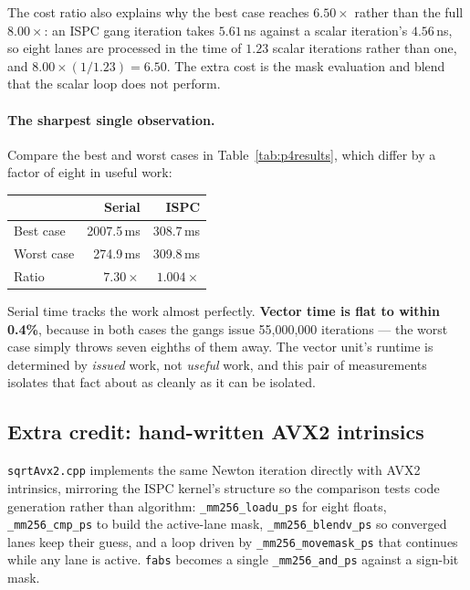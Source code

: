 \documentclass[11pt,a4paper]{article}
\begin{document}
The cost ratio also explains why the best case reaches $6.50\times$
rather than the full $8.00\times$: an ISPC gang iteration takes $5.61$\,ns
against a scalar iteration's $4.56$\,ns, so eight lanes are processed in the
time of $1.23$ scalar iterations rather than one, and
$8.00 \times (1/1.23) = 6.50$. The extra cost is the mask evaluation and blend
that the scalar loop does not perform.

\paragraph{The sharpest single observation.} Compare the best and worst cases
in Table~\ref{tab:p4results}, which differ by a factor of eight in useful work:

\begin{center}
\begin{tabular}{lrr}
\toprule
 & Serial & ISPC \\
\midrule
Best case  & 2007.5\,ms & 308.7\,ms \\
Worst case &  274.9\,ms & 309.8\,ms \\
\midrule
Ratio      & $\mathbf{7.30\times}$ & $\mathbf{1.004\times}$ \\
\bottomrule
\end{tabular}
\end{center}

Serial time tracks the work almost perfectly. \textbf{Vector time is flat to
within 0.4\%}, because in both cases the gangs issue 55{,}000{,}000 iterations
--- the worst case simply throws seven eighths of them away. The vector unit's
runtime is determined by \emph{issued} work, not \emph{useful} work, and this
pair of measurements isolates that fact about as cleanly as it can be isolated.

\subsection{Extra credit: hand-written AVX2 intrinsics}

\texttt{sqrtAvx2.cpp} implements the same Newton iteration directly with AVX2
intrinsics, mirroring the ISPC kernel's structure so the comparison tests code
generation rather than algorithm: \texttt{\_mm256\_loadu\_ps} for eight floats,
\texttt{\_mm256\_cmp\_ps} to build the active-lane mask,
\texttt{\_mm256\_blendv\_ps} so converged lanes keep their guess, and a loop
driven by \texttt{\_mm256\_movemask\_ps} that continues while any lane is
active. \texttt{fabs} becomes a single \texttt{\_mm256\_and\_ps} against a
sign-bit mask.
\end{document}
